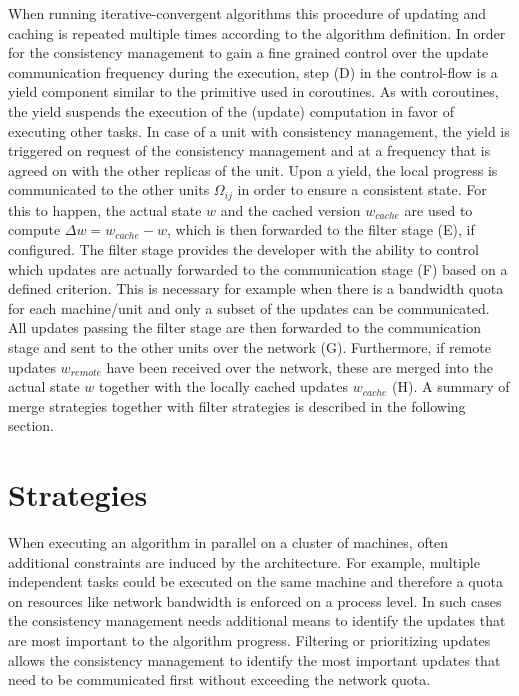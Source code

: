 When running iterative-convergent algorithms this procedure of updating and caching is repeated multiple times according to the algorithm definition.
In order for the consistency management to gain a fine grained control over the update communication frequency during the execution, step (D) in the control-flow is a yield component similar to the primitive used in coroutines.
As with coroutines, the yield suspends the execution of the (update) computation in favor of executing other tasks.
In case of a unit with consistency management, the yield is triggered on request of the consistency management and at a frequency that is agreed on with the other replicas of the unit.
Upon a yield, the local progress is communicated to the other units $\Omega_{ij}$ in order to ensure a consistent state.
For this to happen, the actual state $w$ and the cached version $w_{cache}$ are used to compute $\Delta w = w_{cache} - w$, which is then forwarded to the filter stage (E), if configured.
The filter stage provides the developer with the ability to control which updates are actually forwarded to the communication stage (F) based on a defined criterion.
This is necessary for example when there is a bandwidth quota for each machine/unit and only a subset of the updates can be communicated.
All updates passing the filter stage are then forwarded to the communication stage and sent to the other units over the network (G).
Furthermore, if remote updates $w_{remote}$ have been received over the network, these are merged into the actual state $w$ together with the locally cached updates $w_{cache}$ (H).
A summary of merge strategies together with filter strategies is described in the following section.


\section{Strategies}
\label{s:strategies}
When executing an algorithm in parallel on a cluster of machines, often additional constraints are induced by the architecture.
For example, multiple independent tasks could be executed on the same machine and therefore a quota on resources like network bandwidth is enforced on a process level.
In such cases the consistency management needs additional means to identify the updates that are most important to the algorithm progress.
Filtering or prioritizing updates allows the consistency management to identify the most important updates that need to be communicated first without exceeding the network quota.

